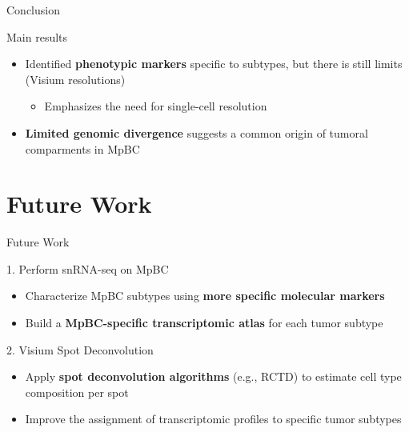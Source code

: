 \documentclass[aspectratio=169]{beamer}
\begin{document}
\begin{frame}{Conclusion}
    \begin{block}{Main results}
        \begin{itemize}
            \item Identified \textbf{phenotypic markers} specific to  subtypes, but there is still limits (Visium resolutions)
                \begin{itemize}
                \item Emphasizes the need for single-cell resolution
                \end{itemize}
            \item \textbf{Limited genomic divergence} suggests a common origin of tumoral comparments in MpBC

        \end{itemize}
    \end{block}
\end{frame}


\section{Future Work}

\begin{frame}{Future Work}

    \begin{block}{1. Perform snRNA-seq on MpBC}
    \begin{itemize}
        \item Characterize MpBC subtypes using \textbf{more specific molecular markers}
        \item Build a \textbf{MpBC-specific transcriptomic atlas} for each tumor subtype
    \end{itemize}
    \end{block}

    \begin{block}{2. Visium Spot Deconvolution}
    \begin{itemize}
        \item Apply \textbf{spot deconvolution algorithms} (e.g., RCTD) to estimate cell type composition per spot
        \item Improve the assignment of transcriptomic profiles to specific tumor subtypes
    \end{itemize}
    \end{block}

\end{frame}
\end{document}

